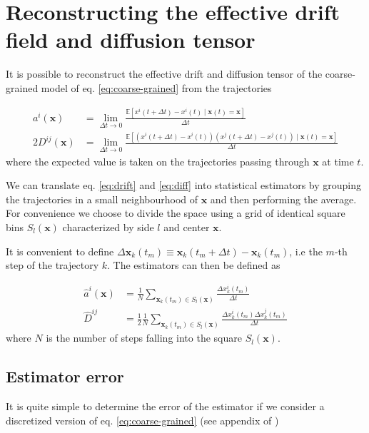 \documentclass[a4paper]{article}
\begin{document}
\section{Reconstructing the effective drift field and diffusion tensor}

It is possible to reconstruct the effective drift and diffusion tensor of the coarse-grained model of eq. \ref{eq:coarse-grained} from the trajectories \cite{hoze2014} \cite{schuss}

\begin{align}
a^i(\bm{x}) &= \lim_{\Delta t \to 0}\frac{\mathbb{E}\left[x^i(t + \Delta t) - x^i(t) \mid \bm{x}(t) = \bm{x}\right]}{\Delta t} \label{eq:drift}\\
2D^{ij}(\bm{x}) &= \lim_{\Delta t \to 0}\frac{\mathbb{E}\left[\left(x^i(t + \Delta t) - x^i(t)\right)\left(x^j(t + \Delta t) - x^j(t)\right) \mid \bm{x}(t) = \bm{x}\right]}{\Delta t} \label{eq:diff}
\end{align}
where the expected value is taken on the trajectories passing through $\bm{x}$ at time $t$.

We can translate eq. \ref{eq:drift} and \ref{eq:diff} into statistical estimators by grouping the trajectories in a small neighbourhood of $\bm{x}$ and then performing the average. For convenience we choose to divide the space using a grid of identical square bins $S_l(\bm{x})$ characterized by side $l$ and center $\bm{x}$.

It is convenient to define $\Delta \bm{x}_k(t_m) \equiv \bm{x}_k(t_m + \Delta t) - \bm{x}_k(t_m)$, i.e the $m$-th step of the trajectory $k$. The estimators can then be defined as

\begin{align}
\hat{a}^i({\bm{x}}) &= \frac{1}{N} \sum_{\bm{x}_k(t_m) \in S_l(\bm{x})} \frac{\Delta x_k^i(t_m)}{\Delta t} \label{eq:drift-estimator} \\
\hat{D}^{ij} &= \frac{1}{2} \frac{1}{N} \sum_{\bm{x}_k(t_m) \in S_l(\bm{x})}\frac{\Delta x_k^i(t_m) \Delta x_k^j(t_m)}{\Delta t} \label{eq:diff-estimator}
\end{align}
where $N$ is the number of steps falling into the square $S_l(\bm{x})$.

\subsection{Estimator error}

It is quite simple to determine the error of the estimator if we consider a discretized version of eq. \ref{eq:coarse-grained} (see appendix of \cite{hoze2012})
\end{document}
